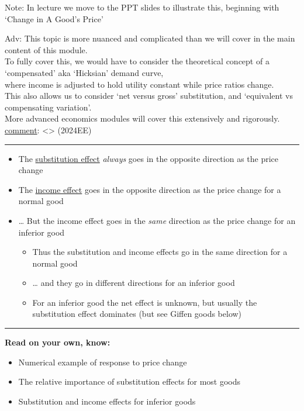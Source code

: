 \documentclass[]{article}
\providecommand{\tightlist}{%
  \setlength{\itemsep}{0pt}\setlength{\parskip}{0pt}}
\begin{document}
Note: In lecture we move to the PPT slides to illustrate this, beginning with `Change in A Good's Price'

Adv: This topic is more nuanced and complicated than we will cover in the main content of this module.\\
To fully cover this, we would have to consider the theoretical concept of a `compensated' aka `Hicksian' demand curve,\\
where income is adjusted to hold utility constant while price ratios change.\\
This also allows us to consider `net versus gross' substitution, and `equivalent vs compensating variation'.\\
More advanced economics modules will cover this extensively and rigorously.
\href{}{comment}: \textless{}\textgreater{} (2024EE)

\begin{center}\rule{0.5\linewidth}{\linethickness}\end{center}

\begin{itemize}
\tightlist
\item
  The \underline{substitution effect} \emph{always} goes in the opposite direction as the price change
\item
  The \underline{income effect} goes in the opposite direction as the price change for a normal good
\item
  \ldots{} But the income effect goes in the \emph{same} direction as the price change for an inferior good

  \begin{itemize}
  \tightlist
  \item
    Thus the substitution and income effects go in the same direction for a normal good
  \item
    \ldots{} and they go in different directions for an inferior good
  \item
    For an inferior good the net effect is unknown, but usually the substitution effect dominates (but see Giffen goods below)
  \end{itemize}
\end{itemize}

\begin{center}\rule{0.5\linewidth}{\linethickness}\end{center}

\textbf{Read on your own, know:}

\begin{itemize}
\tightlist
\item
  Numerical example of response to price change
\item
  The relative importance of substitution effects for most goods
\item
  Substitution and income effects for inferior goods
\end{itemize}
\end{document}
